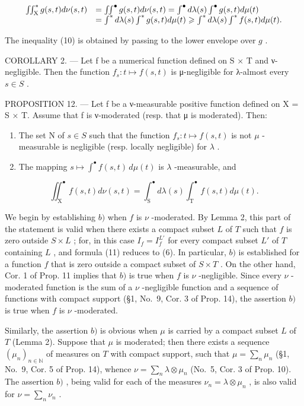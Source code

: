 \[
\begin{array}{r l} \iint_ {\mathrm{X}} ^ {*} g (s, t) d \nu (s, t) & = \iint^ {\bullet} g (s, t) d \nu (s, t) = \int^ {\bullet} d \lambda (s) \int^ {\bullet} g (s, t) d \mu (t) \\ & = \int^ {*} d \lambda (s) \int^ {*} g (s, t) d \mu (t) \geqslant \int^ {*} d \lambda (s) \int^ {*} f (s, t) d \mu (t). \end{array}
\]

The inequality (10) is obtained by passing to the lower envelope over \(g\) .

COROLLARY 2. --- Let f be a numerical function defined on S × T and ν-negligible. Then the function \(f_{s}: t \mapsto f(s, t)\) is μ-negligible for λ-almost every \(s \in S\) .

PROPOSITION 12. --- Let f be a ν-measurable positive function defined on X = S × T. Assume that f is ν-moderated (resp. that μ is moderated). Then:

\begin{enumerate}
\def\labelenumi{\alph{enumi})}
\item
  The set N of \(s \in S\) such that the function \(f_{s}: t \mapsto f(s, t)\) is not \(\mu\) -measurable is negligible (resp. locally negligible) for \(\lambda\) .
\item
  The mapping \(s \mapsto \int^{\bullet} f(s, t) \, d\mu(t)\) is \(\lambda\) -measurable, and
\end{enumerate}

\[
\iint_ {\mathrm{X}} ^ {\bullet} f (s, t) d \nu (s, t) = \int_ {\mathrm{S}} ^ {\bullet} d \lambda (s) \int_ {\mathrm{T}} ^ {\bullet} f (s, t) d \mu (t).\tag{11}
\]

We begin by establishing \(b)\) when \(f\) is \(\nu\) -moderated. By Lemma 2, this part of the statement is valid when there exists a compact subset \(L\) of \(T\) such that \(f\) is zero outside \(S \times L\) ; for, in this case \(I_f = I_f^{L'}\) for every compact subset \(L'\) of \(T\) containing \(L\) , and formula (11) reduces to (6). In particular, \(b)\) is established for a function \(f\) that is zero outside a compact subset of \(S \times T\) . On the other hand, Cor. 1 of Prop. 11 implies that \(b)\) is true when \(f\) is \(\nu\) -negligible. Since every \(\nu\) -moderated function is the sum of a \(\nu\) -negligible function and a sequence of functions with compact support (§1, No.~9, Cor. 3 of Prop. 14), the assertion \(b)\) is true when \(f\) is \(\nu\) -moderated.

Similarly, the assertion \(b)\) is obvious when \(\mu\) is carried by a compact subset \(L\) of \(T\) (Lemma 2). Suppose that \(\mu\) is moderated; then there exists a sequence \((\mu_n)_{n \in \mathbb{N}}\) of measures on \(T\) with compact support, such that \(\mu = \sum_{n} \mu_n\) (§1, No.~9, Cor. 5 of Prop. 14), whence \(\nu = \sum_{n} \lambda \otimes \mu_n\) (No.~5, Cor. 3 of Prop. 10). The assertion \(b)\) , being valid for each of the measures \(\nu_n = \lambda \otimes \mu_n\) , is also valid for \(\nu = \sum_{n} \nu_n\) .

